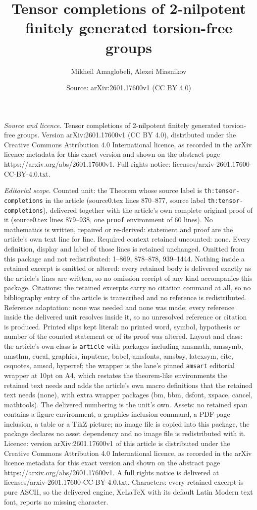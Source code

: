 \documentclass[10pt,a4paper]{amsart}
\title[Tensor completions of 2-nilpotent finitely generated torsion]{Tensor completions of 2-nilpotent finitely generated torsion-free groups}
\author{Mikheil Amaglobeli, Alexei Miasnikov}
\date{Source: arXiv:2601.17600v1 (CC BY 4.0)}
\begin{document}
\maketitle

\noindent\emph{Source and licence.} Tensor completions of 2-nilpotent finitely generated torsion-free groups. Version arXiv:2601.17600v1 (CC BY 4.0), distributed under the Creative Commons Attribution 4.0 International licence, as recorded in the arXiv licence metadata for this exact version and shown on the abstract page https://arxiv.org/abs/2601.17600v1. Full rights notice: licenses/arxiv-2601.17600-CC-BY-4.0.txt.\par\smallskip

\noindent\textit{Editorial scope.} Counted unit: the Theorem whose source label is \texttt{th:tensor-completions} in the article (source0.tex lines 870--877, source label \texttt{th:tensor-completions}), delivered together with the article's own complete original proof of it (source0.tex lines 879--938, one \texttt{proof} environment of 60 lines). No mathematics is written, repaired or re-derived: statement and proof are the article's own text line for line. Required context retained uncounted: none. Every definition, display and label of those lines is retained unchanged. Omitted from this package and not redistributed: 1--869, 878--878, 939--1444. Nothing inside a retained excerpt is omitted or altered: every retained body is delivered exactly as the article's lines are written, so no omission receipt of any kind accompanies this package. Citations: the retained excerpts carry no citation command at all, so no bibliography entry of the article is transcribed and no reference is redistributed. Reference adaptation: none was needed and none was made; every reference inside the delivered unit resolves inside it, so no unresolved reference or citation is produced. Printed slips kept literal: no printed word, symbol, hypothesis or number of the counted statement or of its proof was altered. Layout and class: the article's own class is \texttt{article} with packages including amsmath, amssymb, amsthm, eucal, graphics, inputenc, babel, amsfonts, amsbsy, latexsym, cite, csquotes, amscd, hyperref; the wrapper is the lane's pinned \texttt{amsart} editorial wrapper at 10pt on A4, which restates the theorem-like environments the retained text needs and adds the article's own macro definitions that the retained text needs (none), with extra wrapper packages (bm, bbm, dsfont, xspace, cancel, mathtools). The delivered numbering is the unit's own. Assets: no retained span contains a figure environment, a graphics-inclusion command, a PDF-page inclusion, a table or a TikZ picture; no image file is copied into this package, the package declares no asset dependency and no image file is redistributed with it. Licence: version arXiv:2601.17600v1 of this article is distributed under the Creative Commons Attribution 4.0 International licence, as recorded in the arXiv licence metadata for this exact version and shown on the abstract page https://arxiv.org/abs/2601.17600v1. A full rights notice is delivered at licenses/arxiv-2601.17600-CC-BY-4.0.txt. Characters: every retained excerpt is pure ASCII, so the delivered engine, XeLaTeX with its default Latin Modern text font, reports no missing character.
\end{document}
